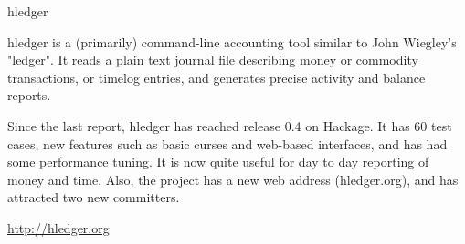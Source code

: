 \begin{hcarentry}{hledger}
\participants{}
\makeheader

hledger is a (primarily) command-line accounting tool similar to John
Wiegley's "ledger".  It reads a plain text journal file describing money
or commodity transactions, or timelog entries, and generates precise
activity and balance reports.

Since the last report, hledger has reached release 0.4 on Hackage. It has
60 test cases, new features such as basic curses and web-based interfaces,
and has had some performance tuning. It is now quite useful for day to day
reporting of money and time. Also, the project has a new web address
(hledger.org), and has attracted two new committers.

\FurtherReading
  \url{http://hledger.org}
\end{hcarentry}
